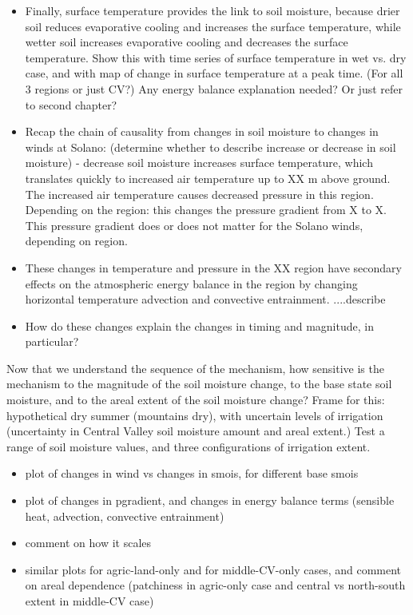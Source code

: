 \documentclass[12pt]{amsart}
\begin{document}
\begin{itemize}
\item Finally, surface temperature provides the link to soil moisture, because drier soil reduces evaporative cooling and increases the surface temperature, while wetter soil increases evaporative cooling and decreases the surface temperature.  Show this with time series of surface temperature in wet vs. dry case, and with map of change in surface temperature at a peak time.  (For all 3 regions or just CV?)  Any energy balance explanation needed?  Or just refer to second chapter?
\item Recap the chain of causality from changes in soil moisture to changes in winds at Solano: (determine whether to describe increase or decrease in soil moisture) - decrease soil moisture increases surface temperature, which translates quickly to increased air temperature up to XX m above ground.  The increased air temperature causes decreased pressure in this region.  Depending on the region: this changes the pressure gradient from X to X.  This pressure gradient does or does not matter for the Solano winds, depending on region.
\item These changes in temperature and pressure in the XX region have secondary effects on the atmospheric energy balance in the region by changing horizontal temperature advection and convective entrainment.  ....describe
\item How do these changes explain the changes in timing and magnitude, in particular?
\end{itemize}

Now that we understand the sequence of the mechanism, how sensitive is the mechanism to the magnitude of the soil moisture change, to the base state soil moisture, and to the areal extent of the soil moisture change?  Frame for this: hypothetical dry summer (mountains dry), with uncertain levels of irrigation (uncertainty in Central Valley soil moisture amount and areal extent.)  Test a range of soil moisture values, and three configurations of irrigation extent.

\begin{itemize}
\item plot of changes in wind vs changes in smois, for different base smois
\item plot of changes in pgradient, and changes in energy balance terms (sensible heat, advection, convective entrainment)
\item comment on how it scales
\item similar plots for agric-land-only and for middle-CV-only cases, and comment on areal dependence (patchiness in agric-only case and central vs north-south extent in middle-CV case)
\end{itemize}
\end{document}
